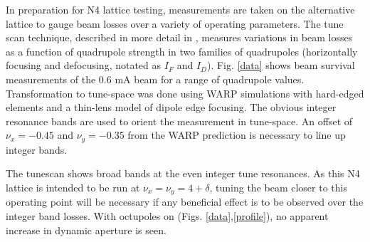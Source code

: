 In preparation for N4 lattice testing, measurements are taken on the alternative lattice to gauge beam losses over a variety of operating parameters. The tune scan technique, described in more detail in \cite{tunescan}, measures variations in beam losses as a function of quadrupole strength in two families of quadrupoles (horizontally focusing and defocusing, notated as $I_F$ and $I_D$). Fig. \ref{data} shows beam survival measurements of the 0.6 mA beam for a range of quadrupole values.  Transformation to tune-space was done using WARP simulations with hard-edged elements and a thin-lens model of dipole edge focusing. The obvious integer resonance bands are used to orient the measurement in tune-space. An offset of $\nu_x = -0.45$ and $\nu_y = -0.35$ from the WARP prediction is necessary to line up integer bands. 

The tunescan shows broad bands at the even integer tune resonances. As this N4 lattice is intended to be run at $\nu_x=\nu_y=4 + \delta$, tuning the beam closer to this operating point will be necessary if any beneficial effect is to be observed over the integer band losses. With octupoles on (Figs. \ref{data},\ref{profile}), no apparent increase in dynamic aperture is seen. 

